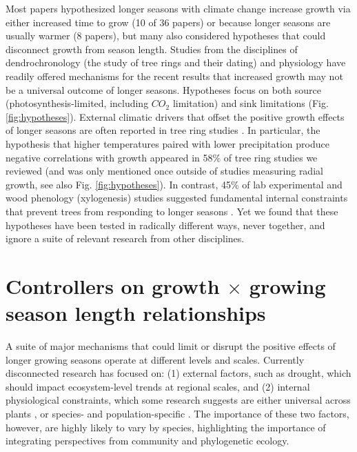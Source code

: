 \documentclass[11pt]{article}
\begin{document}
Most papers hypothesized longer seasons with climate change increase growth via either increased time to grow (10 of 36 papers) or because longer seasons are usually warmer (8 papers), but many also considered hypotheses that could disconnect growth from season length. Studies from the disciplines of dendrochronology (the study of tree rings and their dating) and physiology have readily offered mechanisms for the recent results that increased growth may not be a universal outcome of longer seasons. Hypotheses focus on both source (photosynthesis-limited, including $CO_2$ limitation) and sink limitations (Fig. \ref{fig:hypotheses}). External climatic drivers that offset the positive growth effects of longer seasons are often reported in tree ring studies \citep{kolavr2016response,de2022temperature,camarero2022decoupled}. In particular, the hypothesis that higher temperatures paired with lower precipitation produce negative correlations with growth appeared in 58\% of tree ring studies we reviewed (and was only mentioned once outside of studies measuring radial growth, see also Fig. \ref{fig:hypotheses}). In contrast, 45\% of lab experimental and wood phenology (xylogenesis) studies suggested fundamental internal constraints that prevent trees from responding to longer seasons \citep[Fig. \ref{fig:heatmapssupp},][]{cuny2012life,michelot2012comparing,zohner2023effect}. Yet we found that these hypotheses have been tested in radically different ways, never together, and ignore a suite of relevant research from other disciplines. %
 
\section*{Controllers on growth $\times$ growing season length relationships}

A suite of major mechanisms that could limit or disrupt the positive effects of longer growing seasons operate at different levels and scales. Currently disconnected research has focused on: (1) external factors, such as drought, which should impact ecosystem-level trends at regional scales, and (2) internal physiological constraints, which some research suggests are either universal across plants \citep[e.g.,][]{zohner2023effect}, or species- and population-specific \citep[e.g.,][]{soolanayakanahally2013timing}. The importance of these two factors, however, are highly likely to vary by species, highlighting the importance of integrating perspectives from community and phylogenetic ecology. 
\end{document}
